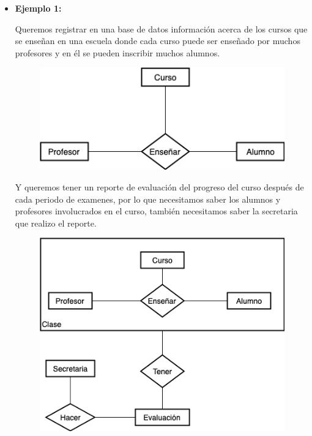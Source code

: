 \documentclass[letterpaper,11pt]{article}
\begin{document}
\begin{itemize}
    \begin{itemize}
        \item  \textbf{Ejemplo 1:}
        
               Queremos registrar en una base de datos información acerca 
               de los cursos que se enseñan en una escuela donde cada 
               curso puede ser enseñado por muchos profesores y en él 
               se pueden inscribir muchos alumnos. 

               \begin{figure}[h]
                \centering
                \includegraphics[scale=0.6]{./imagenes/Ejemplo1.jpg}
                \end{figure}

               Y queremos tener un reporte de evaluación del
               progreso del curso después de cada periodo de examenes, 
               por lo que necesitamos saber los alumnos y profesores 
               involucrados en el curso, también necesitamos saber 
               la secretaria que realizo el reporte. 
               
               \begin{figure}[H]
                \centering
                \includegraphics[scale=0.6]{./imagenes/Ejemplo1a.jpg}
                \end{figure} 


\end{itemize}
\end{itemize}
\end{document}
